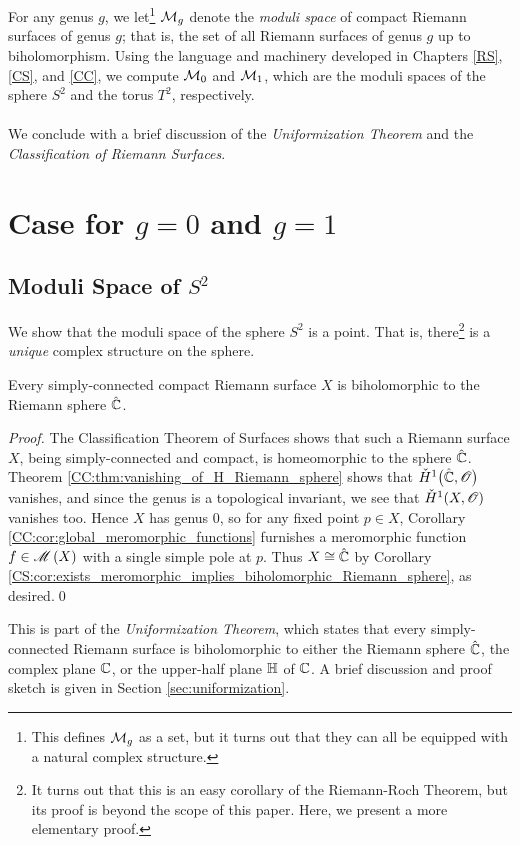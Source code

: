 \documentclass[../Moduli_Spaces_of_Riemann_Surfaces.tex]{subfiles}
\begin{document}
    For any genus $g$, we let\footnote{This defines $\mathcal{M}_g$ as a set, but it turns out that they can all be equipped with a natural complex structure.} $\mathcal{M}_g$ denote the \textit{moduli space} of compact Riemann surfaces of genus $g$; that is, the set of all Riemann surfaces of genus $g$ up to biholomorphism. Using the language and machinery developed in Chapters \ref{RS}, \ref{CS}, and \ref{CC}, we compute $\mathcal{M}_0$ and $\mathcal{M}_1$, which are the moduli spaces of the sphere $S^2$ and the torus $T^2$, respectively.\\\ \\
    We conclude with a brief discussion of the \textit{Uniformization Theorem} and the \textit{Classification of Riemann Surfaces}.
    \section{Case for $g=0$ and $g=1$}
    \subsection{Moduli Space of $S^2$}\label{MS:sec:moduli_space_of_sphere}
    We show that the moduli space of the sphere $S^2$ is a point. That is, there\footnote{It turns out that this is an easy corollary of the Riemann-Roch Theorem, but its proof is beyond the scope of this paper. Here, we present a more elementary proof.} is a \textit{unique} complex structure on the sphere.
    \begin{theorem}\label{MS:thm:simply-connect_compact_biholomorphic_Riemann_sphere}
        Every simply-connected compact Riemann surface $X$ is biholomorphic to the Riemann sphere $\hat{\mathbb{C}}$.
    \end{theorem}
    \begin{proof}
        The Classification Theorem of Surfaces shows that such a Riemann surface $X$, being simply-connected and compact, is homeomorphic to the sphere $\hat{\mathbb{C}}$. Theorem \ref{CC:thm:vanishing_of_H_Riemann_sphere} shows that $\check{H}^1\big(\hat{\mathbb{C}},\mathscr{O}\big)$ vanishes, and since the genus is a topological invariant, we see that $\check{H}^1\!\left(X,\mathscr{O}\right)$ vanishes too. Hence $X$ has genus $0$, so for any fixed point $p\in X$, Corollary \ref{CC:cor:global_meromorphic_functions} furnishes a meromorphic function $f\in\mathscr{M}\left(X\right)$ with a single simple pole at $p$. Thus $X\cong\hat{\mathbb{C}}$ by Corollary \ref{CS:cor:exists_meromorphic_implies_biholomorphic_Riemann_sphere}, as desired.\qed
    \end{proof}
    \begin{remark}
        This is part of the \textit{Uniformization Theorem}, which states that every simply-connected Riemann surface is biholomorphic to either the Riemann sphere $\hat{\mathbb{C}}$, the complex plane $\mathbb{C}$, or the upper-half plane $\mathbb{H}$ of $\mathbb{C}$. A brief discussion and proof sketch is given in Section \ref{sec:uniformization}.\exqed
    \end{remark}
\end{document}
